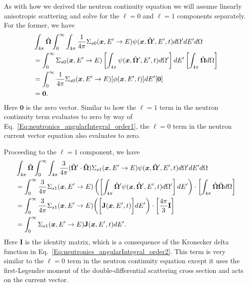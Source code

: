 As with how we derived the neutron continuity equation we will assume linearly anisotropic scattering and solve for the $\ell = 0$ and $\ell = 1$ components separately. For the former, we have
\begin{align}
  &\int_{4\pi} \hat{\mathbf{\Omega}} \int_0^\infty \int_{4\pi}  \frac{1}{4\pi} \Sigma_{s0}(\bm{x}, E' \rightarrow E )  \psi(\bm{x},\hat{\mathbf{\Omega}}',E',t) d\Omega' dE' d\Omega \nonumber \\
  &= \int_0^\infty \Sigma_{s0}(\bm{x}, E' \rightarrow E ) \left[ \int_{4\pi}  \psi(\bm{x},\hat{\mathbf{\Omega}}',E',t) d\Omega' \right] dE' \left[ \int_{4\pi} \hat{\mathbf{\Omega}} d\Omega \right] \nonumber \\
  &= \int_0^\infty \frac{1}{4\pi} \Sigma_{s0}(\bm{x}, E' \rightarrow E ) [ \phi(\bm{x},E',t) ] dE'  [ \mathbf{0} ] \nonumber \\*
  &= \mathbf{0}. \nonumber
\end{align}
Here $\mathbf{0}$ is the zero vector. Similar to how the $\ell = 1$ term in the neutron continuity term evaluates to zero by way of Eq.~\eqref{Eq:neutronics_angularIntegral_order1}, the $\ell = 0$ term in the neutron current vector equation also evaluates to zero.

Proceeding to the $\ell = 1$ component, we have
\begin{align}
  &\int_{4\pi} \hat{\mathbf{\Omega}} \int_0^\infty \int_{4\pi}  \frac{3}{4\pi} ( \hat{\mathbf{\Omega}}' \cdot \hat{\mathbf{\Omega}} )  \Sigma_{s1}(\bm{x}, E' \rightarrow E )  \psi(\bm{x},\hat{\mathbf{\Omega}}',E',t) d\Omega' dE' d\Omega \nonumber \\
  &= \int_0^\infty \frac{3}{4\pi} \Sigma_{s1}(\bm{x}, E' \rightarrow E ) \left( \left[ \int_{4\pi} \hat{\mathbf{\Omega}}' \psi(\bm{x},\hat{\mathbf{\Omega}}',E',t) d\Omega' \right] dE' \right) \cdot \left[  \int_{4\pi} \hat{\mathbf{\Omega}} \hat{\mathbf{\Omega}} d\Omega \right]   \nonumber \\
  &= \int_0^\infty \frac{3}{4\pi} \Sigma_{s1}(\bm{x}, E' \rightarrow E ) \bigg( \bigg[ \mathbf{J}(\bm{x},E',t) \bigg] dE' \bigg) \cdot \bigg[ \frac{4\pi}{3} \mathbf{I} \bigg] \nonumber \\
  &= \int_0^\infty \Sigma_{s1}(\bm{x}, E' \rightarrow E ) \mathbf{J}(\bm{x},E',t) dE' . \nonumber
\end{align}
Here $\mathbf{I}$ is the identity matrix, which is a consequence of the Kronecker delta function in Eq.~\eqref{Eq:neutronics_angularIntegral_order2}. This term is very similar to the $\ell = 0$ term in the neutron continuity equation except it uses the first-Legendre moment of the double-differential scattering cross section and acts on the current vector.

